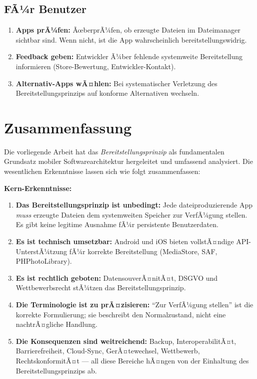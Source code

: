 ﻿\documentclass[12pt, a4paper]{article}
\begin{document}
\subsection{FÃ¼r Benutzer}

\begin{enumerate}[label=\textbf{B\arabic*.}]
  \item \textbf{Apps prÃ¼fen:} ÃœberprÃ¼fen, ob erzeugte Dateien im Dateimanager
    sichtbar sind. Wenn nicht, ist die App wahrscheinlich bereitstellungswidrig.
  \item \textbf{Feedback geben:} Entwickler Ã¼ber fehlende systemweite
    Bereitstellung informieren (Store-Bewertung, Entwickler-Kontakt).
  \item \textbf{Alternativ-Apps wÃ¤hlen:} Bei systematischer Verletzung des
    Bereitstellungsprinzips auf konforme Alternativen wechseln.
\end{enumerate}

\section{Zusammenfassung}
\label{sec:zusammenfassung}

Die vorliegende Arbeit hat das \emph{Bereitstellungsprinzip} als fundamentalen
Grundsatz mobiler Softwarearchitektur hergeleitet und umfassend analysiert.
Die wesentlichen Erkenntnisse lassen sich wie folgt zusammenfassen:

\noindent\textbf{Kern-Erkenntnisse:}
\begin{enumerate}[leftmargin=*, label=\textbf{\arabic*.}]
  \item \textbf{Das Bereitstellungsprinzip ist unbedingt:} Jede dateiproduzierende
    App \emph{muss} erzeugte Dateien dem systemweiten Speicher zur VerfÃ¼gung stellen.
    Es gibt keine legitime Ausnahme fÃ¼r persistente Benutzerdaten.
  \item \textbf{Es ist technisch umsetzbar:} Android und iOS bieten vollstÃ¤ndige
    API-UnterstÃ¼tzung fÃ¼r korrekte Bereitstellung (MediaStore, SAF, PHPhotoLibrary).
  \item \textbf{Es ist rechtlich geboten:} DatensouverÃ¤nitÃ¤t, DSGVO und
    Wettbewerbsrecht stÃ¼tzen das Bereitstellungsprinzip.
  \item \textbf{Die Terminologie ist zu prÃ¤zisieren:} \enquote{Zur VerfÃ¼gung stellen}
    ist die korrekte Formulierung; sie beschreibt den Normalzustand, nicht
    eine nachtrÃ¤gliche Handlung.
  \item \textbf{Die Konsequenzen sind weitreichend:} Backup, InteroperabilitÃ¤t,
    Barrierefreiheit, Cloud-Sync, GerÃ¤tewechsel, Wettbewerb, RechtskonformitÃ¤t
    --- all diese Bereiche hÃ¤ngen von der Einhaltung des Bereitstellungsprinzips ab.
\end{enumerate}
\end{document}
